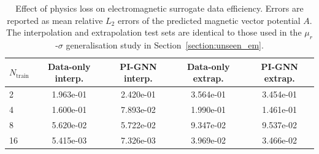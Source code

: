 \begin{table}[htbp]
    \centering
    \begin{tabular}{lcccc}
        \hline
        $N_{\mathrm{train}}$
        & Data-only interp. & PI-GNN interp. & Data-only extrap. & PI-GNN extrap. \\
        \hline
        2  & 1.963e-01 & 2.420e-01 & 3.564e-01 & 3.454e-01 \\
        4  & 1.600e-01 & 7.893e-02 & 1.990e-01 & 1.461e-01 \\
        8  & 5.620e-02 & 5.722e-02 & 9.347e-02 & 9.537e-02 \\
        16  & 5.415e-03 & 7.326e-03 & 3.969e-02 & 3.466e-02 \\
        \hline
    \end{tabular}
    \caption{Effect of physics loss on electromagnetic surrogate data efficiency. Errors are reported as mean relative \(L_2\) errors of the predicted magnetic vector potential \(A\). The interpolation and extrapolation test sets are identical to those used in the \(\mu_r\)-\(\sigma\) generalisation study in Section~\ref{section:unseen_em}.}
    \label{tab:em_physics_loss_ablation}
\end{table}

